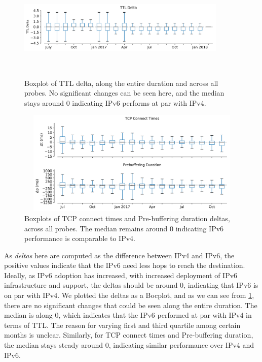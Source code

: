 \FloatBarrier

\begin{figure}[!ht]
	\centering
	\includegraphics[keepaspectratio, height=5cm, width=10cm]{figures/traceroute/netflix-traceroute-rtt-ttl-deltas-new.pdf}
	\caption[TTL Boxplot Delta]{Boxplot of TTL delta, along the entire duration and across all probes. No significant changes can be seen here, and the median stays around 0 indicating IPv6 performs at par with IPv4. }
	\label{fig:TTL Boxplot Delta}
\end{figure}

\begin{figure}[!ht]
	\centering
	\includegraphics[keepaspectratio, height=5cm, width=15cm]{figures/traceroute/netflix-delay-boxplot.pdf}
	\caption[TCP and Prebuffering Duration Boxplot Delta]{Boxplots of TCP connect times and Pre-buffering duration deltas, across all probes. The median remains around 0 indicating IPv6 performance is comparable to IPv4.}
	\label{fig:TCP and Prebuffering Duration Boxplot Delta}
\end{figure}

As \textit{deltas} here are computed as the difference between IPv4 and IPv6, the positive values indicate that the IPv6 need less hops to reach the destination. 
Ideally, as IPv6 adoption has increased, with increased deployment of IPv6 infrastructure and support, the deltas should be around 0, indicating that IPv6 is on par with IPv4. 
We plotted the deltas as a Bocplot, and as we can see from \cref{fig:TTL Boxplot Delta}, there are no significant changes that could be seen along the entire duration. 
The median is along 0, which indicates that the IPv6 performed at par with IPv4 in terms of TTL. The reason for varying first and third quartile among certain months is unclear.  
Similarly, for TCP connect times and Pre-buffering duration, the median stays steady around 0, indicating similar performance over IPv4 and IPv6. 

